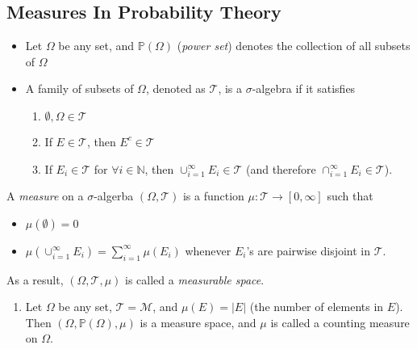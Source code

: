 \subsection{Measures In Probability Theory}

\begin{definition}
\begin{itemize}
\item
Let $\Omega$ be any set, and $\mathbb{P}(\Omega)$ (\emph{power set}) denotes the collection of all subsets of $\Omega$
\item
A family of subsets of $\Omega$, denoted as $\mathcal{T}$, is a $\sigma$-algebra if it satisfies
\begin{enumerate}
\item
$\emptyset,\Omega\in\mathcal{T}$
\item
If $E \in \mathcal{T}$, then $E^c \in \mathcal{T}$
\item
If $E_i\in\mathcal{T}$ for $\forall i\in\mathbb{N}$,
then $\cup_{i=1}^\infty E_i\in\mathcal{T}$ (and therefore $\cap_{i=1}^\infty E_i\in\mathcal{T}$).
\end{enumerate}
\end{itemize}
\end{definition}

\begin{definition}[Measure]
A \emph{measure} on a $\sigma$-algerba $(\Omega,\mathcal{T})$ is a function 
$\mu:\mathcal{T}\to[0,\infty]$ 
such that
\begin{itemize}
\item
$\mu(\emptyset) = 0$
\item
$\mu(\cup_{i=1}^\infty E_i)=\sum_{i=1}^\infty\mu(E_i)$ whenever $E_i$'s are pairwise disjoint in $\mathcal{T}$.
\end{itemize}
As a result, $(\Omega,\mathcal{T},\mu)$ is called a \emph{measurable space}.
\end{definition}

\begin{example}
\begin{enumerate}
\item
Let $\Omega$ be any set, $\mathcal{T}=\mathcal{M}$, and $\mu(E)=|E|$ (the number of elements in $E$). Then $(\Omega,\mathbb{P}(\Omega),\mu)$ is a measure space, and $\mu$ is called a counting measure on $\Omega$.
\end{enumerate}
\end{example}



